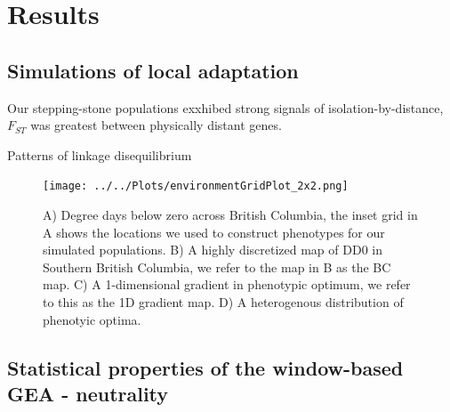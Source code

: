 \documentclass[11pt,twoside,lineno]{GSA_format}
\begin{document}
\section{Results}

\subsection{Simulations of local adaptation}

Our stepping-stone populations exxhibed strong signals of isolation-by-distance,  $F_{ST}$ was greatest between physically distant genes. 

Patterns of linkage disequilibrium

\begin{figure}[H]
  \texttt{[image: ../../Plots/environmentGridPlot\_2x2.png]}
  \caption{A) Degree days below zero across British Columbia, the inset grid in A shows the locations we used to construct phenotypes for our simulated populations. B) A highly discretized map of DD0 in Southern British Columbia, we refer to the map in B as the BC map. C) A 1-dimensional gradient in phenotypic optimum, we refer to this as the 1D gradient map. D) A heterogenous distribution of phenotyic optima.}
  
  \label{fig:envGridPlot}
\end{figure}


\subsection{Statistical properties of the window-based GEA - neutrality}
\end{document}
